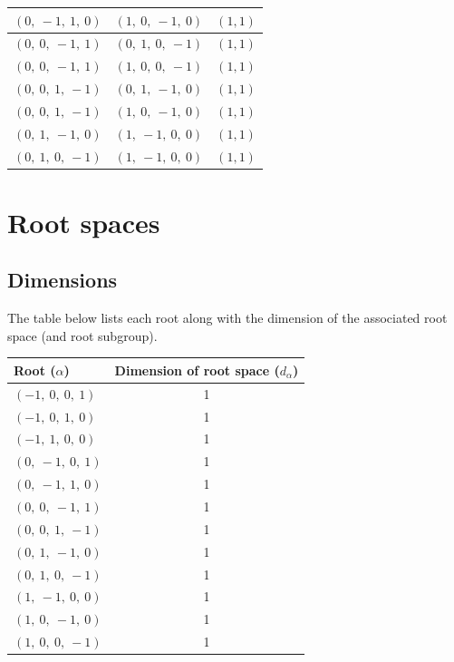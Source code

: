 \documentclass[11pt]{article}
\theoremstyle{definition}
\begin{document}
\begin{tabular}{|l|l|c|}
    \hline
    $\left( 0, \  -1, \  1, \  0\right)$ & $\left( 1, \  0, \  -1, \  0\right)$ & $(1,1)$ \\
    \hline
    $\left( 0, \  0, \  -1, \  1\right)$ & $\left( 0, \  1, \  0, \  -1\right)$ & $(1,1)$ \\
    \hline
    $\left( 0, \  0, \  -1, \  1\right)$ & $\left( 1, \  0, \  0, \  -1\right)$ & $(1,1)$ \\
    \hline
    $\left( 0, \  0, \  1, \  -1\right)$ & $\left( 0, \  1, \  -1, \  0\right)$ & $(1,1)$ \\
    \hline
    $\left( 0, \  0, \  1, \  -1\right)$ & $\left( 1, \  0, \  -1, \  0\right)$ & $(1,1)$ \\
    \hline
    $\left( 0, \  1, \  -1, \  0\right)$ & $\left( 1, \  -1, \  0, \  0\right)$ & $(1,1)$ \\
    \hline
    $\left( 0, \  1, \  0, \  -1\right)$ & $\left( 1, \  -1, \  0, \  0\right)$ & $(1,1)$ \\
    \hline
\end{tabular}


\newpage
\section{Root spaces}

\subsection{Dimensions}

The table below lists each root along with the dimension of the associated root space (and root subgroup).

\bigskip

\noindent \begin{tabular}{|l|c|}
    \hline
    \textbf{Root ($\alpha$)} & \textbf{Dimension of root space ($d_{\alpha}$)} \\
    \hline
    $\left( -1, \  0, \  0, \  1\right)$ & 1 \\
    \hline
    $\left( -1, \  0, \  1, \  0\right)$ & 1 \\
    \hline
    $\left( -1, \  1, \  0, \  0\right)$ & 1 \\
    \hline
    $\left( 0, \  -1, \  0, \  1\right)$ & 1 \\
    \hline
    $\left( 0, \  -1, \  1, \  0\right)$ & 1 \\
    \hline
    $\left( 0, \  0, \  -1, \  1\right)$ & 1 \\
    \hline
    $\left( 0, \  0, \  1, \  -1\right)$ & 1 \\
    \hline
    $\left( 0, \  1, \  -1, \  0\right)$ & 1 \\
    \hline
    $\left( 0, \  1, \  0, \  -1\right)$ & 1 \\
    \hline
    $\left( 1, \  -1, \  0, \  0\right)$ & 1 \\
    \hline
    $\left( 1, \  0, \  -1, \  0\right)$ & 1 \\
    \hline
    $\left( 1, \  0, \  0, \  -1\right)$ & 1 \\
    \hline
\end{tabular}
\end{document}
